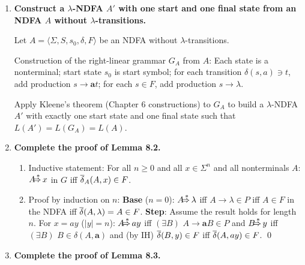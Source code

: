 \begin{enumerate}[{8.}1. ]
\begin{enumerate}
\item Proof that $L(G^\bullet) = L(G_1)\cdot L(G_2)$:
If $u \in L(G_1)$ and $v \in L(G_2)$, then $S_1 \DRightarrow u$ in $G_1$ via some derivation ending with $A \to u'$ (terminal production). In $G^\bullet$, this becomes $S_1 \DRightarrow u'S_2 \DRightarrow u'v = uv$.
Conversely, any derivation in $G^\bullet$ must use rules from $P_1$ until reaching a production $A \to wS_2$, producing some prefix, then switch to $P_2$. \qed
\end{enumerate}

\item \textbf{Construct a $\lambda$-NDFA $A'$ with one start and one final state from an NDFA $A$ without $\lambda$-transitions.}

Let $A = \langle\Sigma,S,s_0,\delta,F\rangle$ be an NDFA without $\lambda$-transitions.

Construction of the right-linear grammar $G_A$ from $A$: Each state is a nonterminal; start state $s_0$ is start symbol; for each transition $\delta(s,a) \ni t$, add production $s \to \pmb{a}t$; for each $s \in F$, add production $s \to \lambda$.

Apply Kleene's theorem (Chapter 6 constructions) to $G_A$ to build a $\lambda$-NDFA $A'$ with exactly one start state and one final state such that $L(A') = L(G_A) = L(A)$.

\item \textbf{Complete the proof of Lemma 8.2.}

\begin{enumerate}
\item Inductive statement: For all $n \geq 0$ and all $x \in \Sigma^n$ and all nonterminals $A$: $A \DRightarrow x$ in $G$ iff $\overline{\delta}_A(A, x) \in F$.

\item Proof by induction on $n$:
\textbf{Base} ($n=0$): $A \DRightarrow \lambda$ iff $A \to \lambda \in P$ iff $A \in F$ in the NDFA iff $\overline{\delta}(A,\lambda) = A \in F$.
\textbf{Step}: Assume the result holds for length $n$. For $x = ay$ ($|y|=n$): $A \DRightarrow ay$ iff $(\exists B)$ $A \to \pmb{a}B \in P$ and $B \DRightarrow y$ iff $(\exists B)$ $B \in \delta(A,\pmb{a})$ and (by IH) $\overline{\delta}(B,y) \in F$ iff $\overline{\delta}(A,ay) \in F$. \qed
\end{enumerate}

\item \textbf{Complete the proof of Lemma 8.3.}


\end{enumerate}
